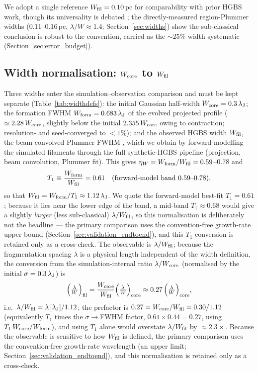 \documentclass[usenatbib,twoside,twocolumn]{mnras}
\begin{document}
We adopt a single reference $W_{\rm fil}=0.10$\,pc for comparability with prior HGBS work, though its universality is debated \citep{Panopoulou2017,Panopoulou2022}; the directly-measured region-Plummer widths ($0.11$--$0.16$\,pc, $\lambda/W\approx1.4$; Section~\ref{sec:widths}) show the sub-classical conclusion is robust to the convention, carried as the $\sim25\%$ width systematic (Section~\ref{sec:error_budget}).

\subsection{Width normalisation: $W_{\rm core}$ to $W_{\rm fil}$}
\label{sec:width_correction}
Three widths enter the simulation--observation comparison and must be kept separate (Table~\ref{tab:widthdefs}): the initial Gaussian half-width $W_{\rm core}=0.3\,\lambda_{\rm J}$; the formation FWHM $W_{\rm form}=0.683\,\lambda_{\rm J}$ of the evolved projected profile ($\simeq2.28\,W_{\rm core}$, slightly below the initial $2.355\,W_{\rm core}$ owing to contraction; resolution- and seed-converged to $<1\%$); and the observed HGBS width $W_{\rm fil}$, the beam-convolved Plummer FWHM \citep{Arzoumanian2019}, which we obtain by forward-modelling the simulated filaments through the full synthetic-HGBS pipeline (projection, beam convolution, Plummer fit). This gives $\eta_W=W_{\rm form}/W_{\rm fil}=0.59$--$0.78$ and
\begin{equation}
T_1 \equiv \frac{W_{\rm form}}{W_{\rm fil}} = 0.61 \quad (\text{forward-model band } 0.59\text{--}0.78),
\label{eq:t1_correction}
\end{equation}
so that $W_{\rm fil}=W_{\rm form}/T_1\approx1.12\,\lambda_{\rm J}$. We quote the forward-model best-fit $T_1=0.61$; because it lies near the lower edge of the band, a mid-band $T_1\approx0.68$ would give a slightly \emph{larger} (less sub-classical) $\lambda/W_{\rm fil}$, so this normalisation is deliberately not the headline --- the primary comparison uses the convention-free growth-rate upper bound (Section~\ref{sec:validation_endtoend}), and this $T_1$ conversion is retained only as a cross-check. The observable is $\lambda/W_{\rm fil}$; because the fragmentation spacing $\lambda$ is a physical length independent of the width definition, the conversion from the simulation-internal ratio $\lambda/W_{\rm core}$ (normalised by the initial $\sigma=0.3\,\lambda_{\rm J}$) is
\begin{equation}
\Big(\tfrac{\lambda}{W}\Big)_{\rm fil} = \frac{W_{\rm core}}{W_{\rm fil}}\Big(\tfrac{\lambda}{W}\Big)_{\rm core} \approx 0.27\,\Big(\tfrac{\lambda}{W}\Big)_{\rm core},
\label{eq:t1_apply}
\end{equation}
i.e.\ $\lambda/W_{\rm fil}=\lambda\,[\lambda_{\rm J}]/1.12$; the prefactor is $0.27=W_{\rm core}/W_{\rm fil}=0.30/1.12$ (equivalently $T_1$ times the $\sigma\!\to\!$FWHM factor, $0.61\times0.44=0.27$, using $T_1\,W_{\rm core}/W_{\rm form}$), and using $T_1$ alone would overstate $\lambda/W_{\rm fil}$ by $\approx2.3\times$. Because the observable is sensitive to how $W_{\rm fil}$ is defined, the primary comparison uses the convention-free growth-rate wavelength (an upper limit; Section~\ref{sec:validation_endtoend}), and this normalisation is retained only as a cross-check.
\end{document}
